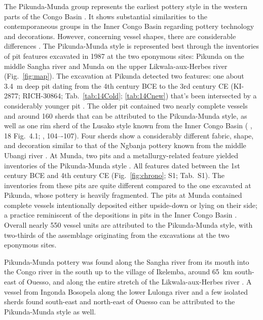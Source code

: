 \documentclass[smallextended,natbib]{svjour3}       %
\begin{document}
The Pikunda-Munda group represents the earliest pottery style in the western parts of the Congo Basin \citep[114--120]{Eggert.1992,Seidensticker.2021e}. It shows substantial similarities to the contemporaneous groups in the Inner Congo Basin regarding pottery technology and decorations. However, concerning vessel shapes, there are considerable differences \citep[107 Ftn.~4]{Wotzka.1995}. The Pikunda-Munda style is represented best through the inventories of pit features excavated in 1987 at the two eponymous sites: Pikunda on the middle Sangha river and Munda on the upper Likwala-aux-Herbes river (Fig.~\ref{fig:map}). The excavation at Pikunda detected two features: one about 3.4~m deep pit dating from the 4th century BCE to the 3rd century CE (KI-2877; RICH-30864; Tab.~\ref{tab:14Cold}; \ref{tab:14Cnew}) that's been intersected by a considerably younger pit \citep[288--300]{Seidensticker.2021e}. The older pit contained two nearly complete vessels and around 160 sherds that can be attributed to the Pikunda-Munda style, as well as one rim sherd of the Lusako style known from the Inner Congo Basin (\citeauthor{Eggert.1992} \citeyear{Eggert.1992}, 18 Fig.~4.1; \citeauthor{Wotzka.1995} \citeyear{Wotzka.1995}, 104–-107). Four sherds show a considerably different fabric, shape, and decoration similar to that of the Ngbanja pottery known from the middle Ubangi river \citep[296 Tab.~34]{Seidensticker.2021e}. At Munda, two pits and a metallurgy-related feature yielded inventories of the Pikunda-Munda style \citep[321--339]{Seidensticker.2021e}. All features dated between the 1st century BCE and 4th century CE (Fig.~\ref{fig:chrono}; S1; Tab.~S1). The inventories from these pits are quite different compared to the one excavated at Pikunda, whose pottery is heavily fragmented. The pits at Munda contained complete vessels intentionally deposited either upside-down or lying on their side; a practice reminiscent of the depositions in pits in the Inner Congo Basin \citep{Wotzka.1993}. Overall nearly 550 vessel units are attributed to the Pikunda-Munda style, with two-thirds of the assemblage originating from the excavations at the two eponymous sites.

Pikunda-Munda pottery was found along the Sangha river from its mouth into the Congo river in the south up to the village of Ikelemba, around 65~km south-east of Ouesso, and along the entire stretch of the Likwala-aux-Herbes river \citep[Fig.~\ref{fig:timeslices_1_eia}B--D;][119 Fig.~49]{Seidensticker.2021e}. A vessel from Ingonda Bosopela along the lower Lulonga river \citep[119 Ftn. 4, 531 Pl. 97.5]{Wotzka.1995} and a few isolated sherds found south-east and north-east of Ouesso \citep[114 Fig.~42]{Gillet.2013} can be attributed to the Pikunda-Munda style as well.
\end{document}

